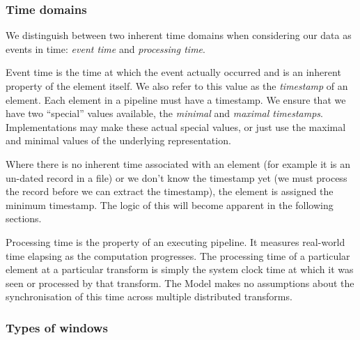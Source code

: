 \subsubsection{Time domains}
We distinguish between two inherent time domains when considering our data as events in time: \emph{event time} and \emph{processing time}.

Event time is the time at which the event actually occurred and is an inherent property of the element itself.
We also refer to this value as the \emph{timestamp} of an element.
Each element in a pipeline must have a timestamp.
We ensure that we have two ``special'' values available, the \emph{minimal} and \emph{maximal timestamps}.
Implementations may make these actual special values, or just use the maximal and minimal values of the underlying representation.

Where there is no inherent time associated with an element (for example it is an un-dated record in a file) or we don't know the timestamp yet (we must process the record before we can extract the timestamp), the element is assigned the minimum timestamp.
The logic of this will become apparent in the following sections.

Processing time is the property of an executing pipeline.
It measures real-world time elapsing as the computation progresses.
The processing time of a particular element at a particular transform is simply the system clock time at which it was seen or processed by that transform.
The Model makes no assumptions about the synchronisation of this time across multiple distributed transforms.

\subsubsection{Types of windows}

